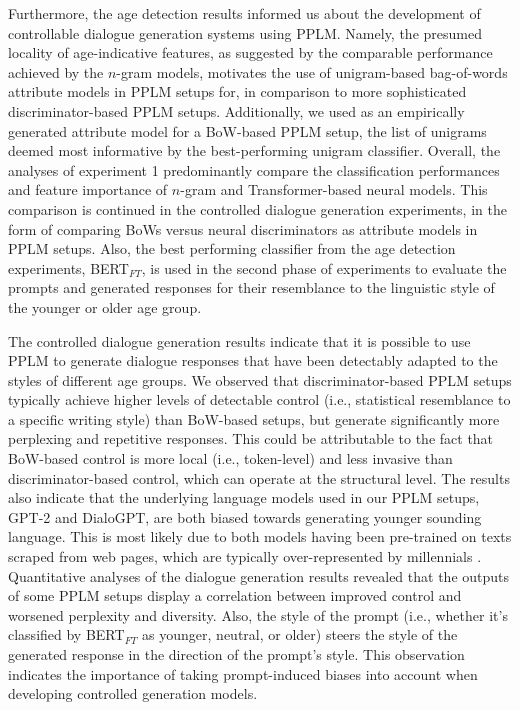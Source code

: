 Furthermore, the age detection results informed us about the development of controllable dialogue generation systems using PPLM. Namely, the presumed locality of age-indicative features, as suggested by the comparable performance achieved by the $n$-gram models, motivates the use of unigram-based bag-of-words attribute models in PPLM setups for, in comparison to more sophisticated discriminator-based PPLM setups. Additionally, we used as an empirically generated attribute model for a BoW-based PPLM setup, the list of unigrams deemed most informative by the best-performing unigram classifier. Overall, the analyses of experiment 1 predominantly compare the classification performances and feature importance of $n$-gram and Transformer-based neural models. This comparison is continued in the controlled dialogue generation experiments, in the form of comparing BoWs versus neural discriminators as attribute models in PPLM setups. Also, the best performing classifier from the age detection experiments, BERT$_{FT}$, is used in the second phase of experiments to evaluate the prompts and generated responses for their resemblance to the linguistic style of the younger or older age group.

The controlled dialogue generation results indicate that it is possible to use PPLM to generate dialogue responses that have been detectably adapted to the styles of different age groups. We observed that discriminator-based PPLM setups typically achieve higher levels of detectable control (i.e., statistical resemblance to a specific writing style) than BoW-based setups, but generate significantly more perplexing and repetitive responses. This could be attributable to the fact that BoW-based control is more local (i.e., token-level) and less invasive than discriminator-based control, which can operate at the structural level. The results also indicate that the underlying language models used in our PPLM setups, GPT-2 and DialoGPT, are both biased towards generating younger sounding language. This is most likely due to both models having been pre-trained on texts scraped from web pages, which are typically over-represented by millennials \citep{radford2019language, zhang2019dialogpt}. 
Quantitative analyses of the dialogue generation results revealed that the outputs of some PPLM setups display a correlation between improved control and worsened perplexity and diversity. Also, the style of the prompt (i.e., whether it's classified by BERT$_{FT}$ as younger, neutral, or older) steers the style of the generated response in the direction of the prompt's style. This observation indicates the importance of taking prompt-induced biases into account when developing controlled generation models.

